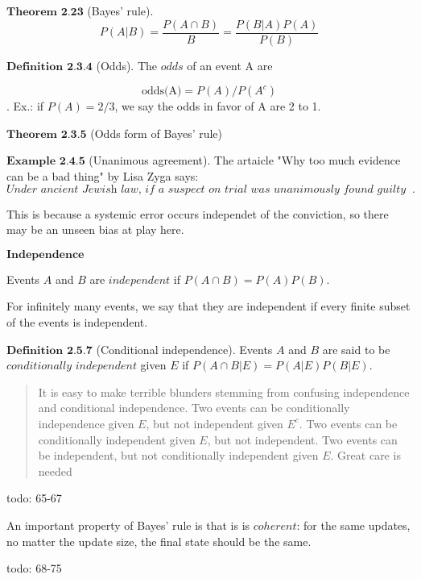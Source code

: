 \documentclass{article}
\begin{document}
    $\textbf{Theorem 2.23}$ (Bayes' rule).
    $$P(A|B)=\frac{P(A\cap B)}{B}=\frac{P(B|A)P(A)}{P(B)}$$

    $\textbf{Definition 2.3.4}$ (Odds). The $\textit{odds}$ of an event A are

    $$\textrm{odds(A)}=P(A)/P(A^c)$$. Ex.: if $P(A)=2/3$, we say the odds in favor of A are 2 to 1.

    $\textbf{Theorem 2.3.5}$ (Odds form of Bayes' rule)

    $\textbf{Example 2.4.5}$ (Unanimous agreement). The artaicle "Why too much evidence can be a bad thing" by Lisa Zyga says:\\

    $\textit{Under ancient Jewish law, if a suspect on trial was unanimously found guilty by all judges, then the suspect was acquitted. This reasoning
    sounds counterintuitive, but the legislators of teh time had noticed that unanimous agreement often indicates the presence of systemic error in 
    the judicial process}.$

    This is because a systemic error occurs independet of the conviction, so there may be an unseen bias at play here.

    $\textbf{Independence}$

    Events $A$ and $B$ are $\textit{independent}$ if $P(A\cap B) = P(A)P(B)$.

    For infinitely many events, we say that they are independent if every finite subset of the events is independent.

    $\textbf{Definition 2.5.7}$ (Conditional independence). Events $A$ and $B$ are said to be $\textit{conditionally independent}$ given $E$ if $P(A\cap B|E) = P(A|E)P(B|E)$.

    \begin{quote}
    It is easy to make terrible blunders stemming from confusing independence and conditional independence. Two events can be conditionally independence given $E$, but not independent given $E^c$. Two events
    can be conditionally independent given $E$, but not independent. Two events can be independent, but not conditionally independent given $E$.
    Great care is needed
    \end{quote}

    todo: 65-67

    An important property of Bayes' rule is that is is $coherent$: for the same updates, no matter the update size, the final state should be the same.

    todo: 68-75
\end{document}
